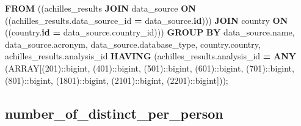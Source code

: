\documentclass[
]{book}
\newenvironment{Shaded}{\begin{snugshade}}{\end{snugshade}}
\newcommand{\CharTok}[1]{\textcolor[rgb]{0.31,0.60,0.02}{#1}}
\newcommand{\DataTypeTok}[1]{\textcolor[rgb]{0.13,0.29,0.53}{#1}}
\newcommand{\DecValTok}[1]{\textcolor[rgb]{0.00,0.00,0.81}{#1}}
\newcommand{\KeywordTok}[1]{\textcolor[rgb]{0.13,0.29,0.53}{\textbf{#1}}}
\newcommand{\NormalTok}[1]{#1}
\newcommand{\OperatorTok}[1]{\textcolor[rgb]{0.81,0.36,0.00}{\textbf{#1}}}
\begin{document}
\begin{Shaded}
\begin{Highlighting}[]
  \KeywordTok{FROM}\NormalTok{ ((achilles\_results}
    \KeywordTok{JOIN}\NormalTok{ data\_source }\KeywordTok{ON}\NormalTok{ ((achilles\_results.data\_source\_id }\OperatorTok{=}\NormalTok{ data\_source.}\KeywordTok{id}\NormalTok{)))}
    \KeywordTok{JOIN}\NormalTok{ country }\KeywordTok{ON}\NormalTok{ ((country.}\KeywordTok{id} \OperatorTok{=}\NormalTok{ data\_source.country\_id)))}
 \KeywordTok{GROUP} \KeywordTok{BY}\NormalTok{ data\_source.name, data\_source.acronym, data\_source.database\_type, country.country, achilles\_results.analysis\_id}
\KeywordTok{HAVING}\NormalTok{ (achilles\_results.analysis\_id }\OperatorTok{=} \KeywordTok{ANY}\NormalTok{ (}\DataTypeTok{ARRAY}\NormalTok{[(}\DecValTok{201}\NormalTok{):}\CharTok{:bigint}\NormalTok{, (}\DecValTok{401}\NormalTok{):}\CharTok{:bigint}\NormalTok{, (}\DecValTok{501}\NormalTok{):}\CharTok{:bigint}\NormalTok{, (}\DecValTok{601}\NormalTok{):}\CharTok{:bigint}\NormalTok{, (}\DecValTok{701}\NormalTok{):}\CharTok{:bigint}\NormalTok{, (}\DecValTok{801}\NormalTok{):}\CharTok{:bigint}\NormalTok{, (}\DecValTok{1801}\NormalTok{):}\CharTok{:bigint}\NormalTok{, (}\DecValTok{2101}\NormalTok{):}\CharTok{:bigint}\NormalTok{, (}\DecValTok{2201}\NormalTok{):}\CharTok{:bigint}\NormalTok{]));}
\end{Highlighting}
\end{Shaded}

\hypertarget{number_of_distinct_per_person}{%
\subsection*{number\_of\_distinct\_per\_person}\label{number_of_distinct_per_person}}
\end{document}
